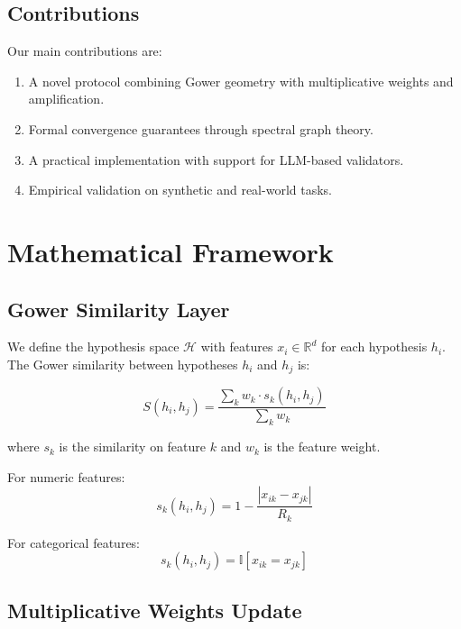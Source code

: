 \documentclass[10pt,a4paper]{article}
\begin{document}
\subsection{Contributions}

Our main contributions are:

\begin{enumerate}
    \item A novel protocol combining Gower geometry with multiplicative weights and amplification.
    \item Formal convergence guarantees through spectral graph theory.
    \item A practical implementation with support for LLM-based validators.
    \item Empirical validation on synthetic and real-world tasks.
\end{enumerate}

\section{Mathematical Framework}

\subsection{Gower Similarity Layer}

We define the hypothesis space $\mathcal{H}$ with features $x_i \in \mathbb{R}^d$ for each hypothesis $h_i$. The Gower similarity between hypotheses $h_i$ and $h_j$ is:

\begin{equation}
S(h_i, h_j) = \frac{\sum_{k} w_k \cdot s_k(h_i, h_j)}{\sum_{k} w_k}
\end{equation}

where $s_k$ is the similarity on feature $k$ and $w_k$ is the feature weight.

For numeric features:
\begin{equation}
s_k(h_i, h_j) = 1 - \frac{|x_{ik} - x_{jk}|}{R_k}
\end{equation}

For categorical features:
\begin{equation}
s_k(h_i, h_j) = \mathbb{I}[x_{ik} = x_{jk}]
\end{equation}

\subsection{Multiplicative Weights Update}
\end{document}
